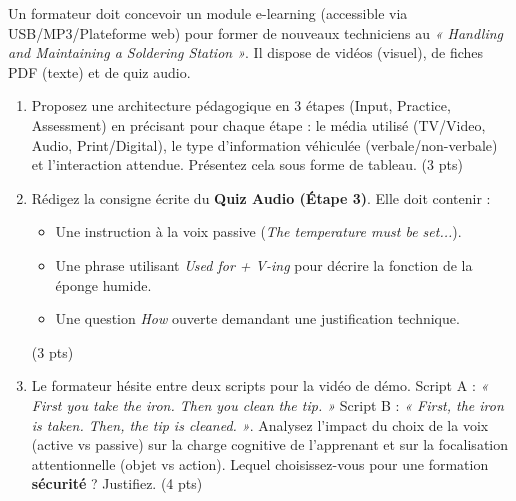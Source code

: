 \documentclass[11pt]{article}
\begin{document}
\begin{exercice}
Un formateur doit concevoir un module e-learning (accessible via USB/MP3/Plateforme web) pour former de nouveaux techniciens au \textit{« Handling and Maintaining a Soldering Station »}. Il dispose de vidéos (visuel), de fiches PDF (texte) et de quiz audio.

\begin{enumerate}
    \item Proposez une architecture pédagogique en 3 étapes (Input, Practice, Assessment) en précisant pour chaque étape : le média utilisé (TV/Video, Audio, Print/Digital), le type d'information véhiculée (verbale/non-verbale) et l'interaction attendue. Présentez cela sous forme de tableau. (3 pts)
    \item Rédigez la consigne écrite du \textbf{Quiz Audio (Étape 3)}. Elle doit contenir :
    \begin{itemize}
        \item Une instruction à la voix passive (\textit{The temperature must be set...}).
        \item Une phrase utilisant \textit{Used for + V-ing} pour décrire la fonction de la éponge humide.
        \item Une question \textit{How} ouverte demandant une justification technique.
    \end{itemize}
    (3 pts)
    \item Le formateur hésite entre deux scripts pour la vidéo de démo. Script A : \textit{« First you take the iron. Then you clean the tip. »} Script B : \textit{« First, the iron is taken. Then, the tip is cleaned. »}. Analysez l'impact du choix de la voix (active vs passive) sur la charge cognitive de l'apprenant et sur la focalisation attentionnelle (objet vs action). Lequel choisissez-vous pour une formation \textbf{sécurité} ? Justifiez. (4 pts)
\end{enumerate}
\end{exercice}
\end{document}
